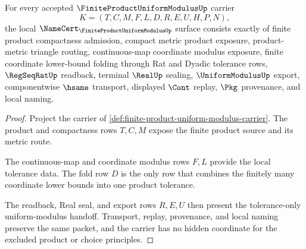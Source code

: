 \begin{theorem}
\label{thm:finite-product-uniform-modulus-namecert-obligations}
For every accepted $\FiniteProductUniformModulusUp$ carrier
$$
K=(T,C,M,F,L,D,R,E,U,H,P,N),
$$
the local $\NameCert_{\FiniteProductUniformModulusUp}$ surface consists exactly of finite product compactness admission, compact metric product exposure, product-metric triangle routing, continuous-map coordinate modulus exposure, finite coordinate lower-bound folding through Rat and Dyadic tolerance rows, $\RegSeqRatUp$ readback, terminal $\RealUp$ sealing, $\UniformModulusUp$ export, componentwise $\hsame$ transport, displayed $\Cont$ replay, $\Pkg$ provenance, and local naming.
\end{theorem}
\begin{proof}
Project the carrier of \autoref{def:finite-product-uniform-modulus-carrier}. The product and compactness rows $T,C,M$ expose the finite product source and its metric route.

The continuous-map and coordinate modulus rows $F,L$ provide the local tolerance data. The fold row $D$ is the only row that combines the finitely many coordinate lower bounds into one product tolerance.

The readback, Real seal, and export rows $R,E,U$ then present the tolerance-only uniform-modulus handoff. Transport, replay, provenance, and local naming preserve the same packet, and the carrier has no hidden coordinate for the excluded product or choice principles.
\end{proof}

